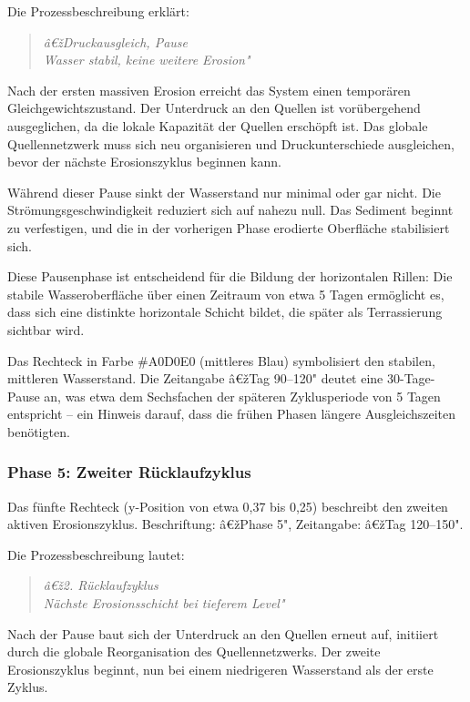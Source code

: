 Die Prozessbeschreibung erklärt:
\begin{quote}
\textit{â€žDruckausgleich, Pause\\
Wasser stabil, keine weitere Erosion"}
\end{quote}

Nach der ersten massiven Erosion erreicht das System einen temporären Gleichgewichtszustand. Der Unterdruck an den Quellen ist vorübergehend ausgeglichen, da die lokale Kapazität der Quellen erschöpft ist. Das globale Quellennetzwerk muss sich neu organisieren und Druckunterschiede ausgleichen, bevor der nächste Erosionszyklus beginnen kann.

Während dieser Pause sinkt der Wasserstand nur minimal oder gar nicht. Die Strömungsgeschwindigkeit reduziert sich auf nahezu null. Das Sediment beginnt zu verfestigen, und die in der vorherigen Phase erodierte Oberfläche stabilisiert sich.

Diese Pausenphase ist entscheidend für die Bildung der horizontalen Rillen: Die stabile Wasseroberfläche über einen Zeitraum von etwa 5 Tagen ermöglicht es, dass sich eine distinkte horizontale Schicht bildet, die später als Terrassierung sichtbar wird.

Das Rechteck in Farbe \#A0D0E0 (mittleres Blau) symbolisiert den stabilen, mittleren Wasserstand. Die Zeitangabe â€žTag 90--120" deutet eine 30-Tage-Pause an, was etwa dem Sechsfachen der späteren Zyklusperiode von 5 Tagen entspricht -- ein Hinweis darauf, dass die frühen Phasen längere Ausgleichszeiten benötigten.

\subsubsection*{Phase 5: Zweiter Rücklaufzyklus}

Das fünfte Rechteck (y-Position von etwa 0,37 bis 0,25) beschreibt den zweiten aktiven Erosionszyklus. Beschriftung: â€žPhase 5", Zeitangabe: â€žTag 120--150".

Die Prozessbeschreibung lautet:
\begin{quote}
\textit{â€ž2. Rücklaufzyklus\\
Nächste Erosionsschicht bei tieferem Level"}
\end{quote}

Nach der Pause baut sich der Unterdruck an den Quellen erneut auf, initiiert durch die globale Reorganisation des Quellennetzwerks. Der zweite Erosionszyklus beginnt, nun bei einem niedrigeren Wasserstand als der erste Zyklus.

